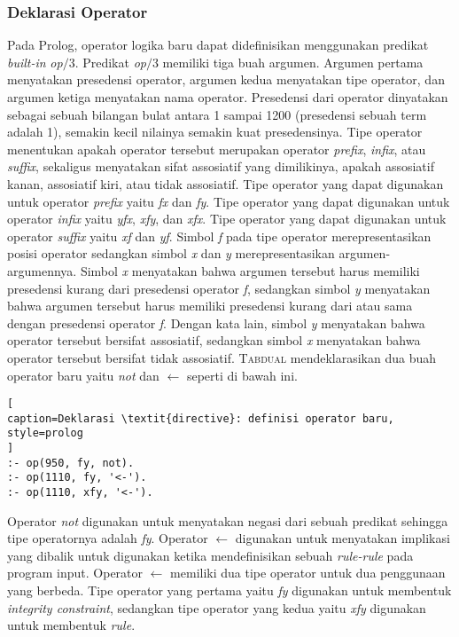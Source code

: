 \subsubsection{Deklarasi Operator}

Pada Prolog, operator logika baru dapat didefinisikan menggunakan predikat \textit{built-in} \textit{op$/$}3. Predikat \textit{op$/$}3 memiliki tiga buah argumen. Argumen pertama menyatakan presedensi operator, argumen kedua menyatakan tipe operator, dan argumen ketiga menyatakan nama operator. Presedensi dari operator dinyatakan sebagai sebuah bilangan bulat antara 1 sampai 1200 (presedensi sebuah term adalah 1), semakin kecil nilainya semakin kuat presedensinya. Tipe operator menentukan apakah operator tersebut merupakan operator \textit{prefix}, \textit{infix}, atau \textit{suffix}, sekaligus menyatakan sifat assosiatif yang dimilikinya, apakah assosiatif kanan, assosiatif kiri, atau tidak assosiatif. Tipe operator yang dapat digunakan untuk operator \textit{prefix} yaitu \textit{fx} dan \textit{fy}. Tipe operator yang dapat digunakan untuk operator \textit{infix} yaitu \textit{yfx}, \textit{xfy}, dan \textit{xfx}. Tipe operator yang dapat digunakan untuk operator \textit{suffix} yaitu \textit{xf} dan \textit{yf}. Simbol \textit{f} pada tipe operator merepresentasikan posisi operator sedangkan simbol \textit{x} dan \textit{y} merepresentasikan argumen-argumennya. Simbol \textit{x} menyatakan bahwa argumen tersebut harus memiliki presedensi kurang dari presedensi operator \textit{f}, sedangkan simbol \textit{y} menyatakan bahwa argumen tersebut harus memiliki presedensi kurang dari atau sama dengan presedensi operator \textit{f}. Dengan kata lain, simbol \textit{y} menyatakan bahwa operator tersebut bersifat assosiatif, sedangkan simbol \textit{x} menyatakan bahwa operator tersebut bersifat tidak assosiatif. \textsc{Tabdual} mendeklarasikan dua buah operator baru yaitu \textit{not} dan $\leftarrow$ seperti di bawah ini.
\\

\begin{lstlisting}[
caption=Deklarasi \textit{directive}: definisi operator baru,
style=prolog
]
:- op(950, fy, not).
:- op(1110, fy, '<-').
:- op(1110, xfy, '<-').
\end{lstlisting}

Operator \textit{not} digunakan untuk menyatakan negasi dari sebuah predikat sehingga tipe operatornya adalah \textit{fy}. Operator $\leftarrow$ digunakan untuk menyatakan implikasi yang dibalik untuk digunakan ketika mendefinisikan sebuah \textit{rule-rule} pada program input. Operator $\leftarrow$ memiliki dua tipe operator untuk dua penggunaan yang berbeda. Tipe operator yang pertama yaitu \textit{fy} digunakan untuk membentuk \textit{integrity constraint}, sedangkan tipe operator yang kedua yaitu \textit{xfy} digunakan untuk membentuk \textit{rule}.

